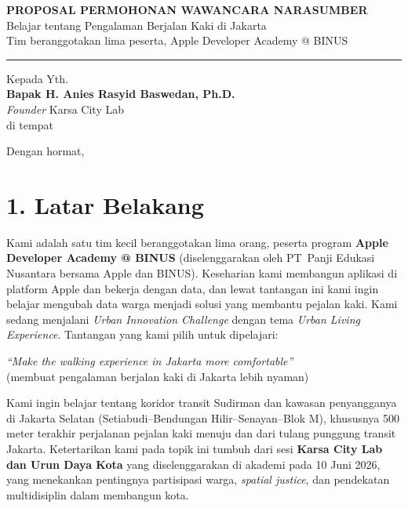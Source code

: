 \documentclass[11pt,a4paper]{article}
\begin{document}
\begin{center}
  {\Large\bfseries PROPOSAL PERMOHONAN WAWANCARA NARASUMBER}\\[4pt]
  {\normalsize Belajar tentang Pengalaman Berjalan Kaki di Jakarta}\\[2pt]
  {\small Tim beranggotakan lima peserta, Apple Developer Academy @ BINUS}
\end{center}

\vspace{4pt}
\hrule
\vspace{14pt}

\noindent
Kepada Yth.\\
\textbf{Bapak H. Anies Rasyid Baswedan, Ph.D.}\\
\textit{Founder} Karsa City Lab\\
di tempat

\vspace{10pt}
Dengan hormat,

\section*{1. Latar Belakang}

Kami adalah satu tim kecil beranggotakan lima orang, peserta program \textbf{Apple Developer Academy @ BINUS} (diselenggarakan oleh PT~Panji Edukasi Nusantara bersama Apple dan BINUS). Keseharian kami membangun aplikasi di platform Apple dan bekerja dengan data, dan lewat tantangan ini kami ingin belajar mengubah data warga menjadi solusi yang membantu pejalan kaki. Kami sedang menjalani \textit{Urban Innovation Challenge} dengan tema \textit{Urban Living Experience}. Tantangan yang kami pilih untuk dipelajari:

\begin{center}
  \textit{``Make the walking experience in Jakarta more comfortable''}\\
  (membuat pengalaman berjalan kaki di Jakarta lebih nyaman)
\end{center}

Kami ingin belajar tentang koridor transit Sudirman dan kawasan penyangganya di Jakarta Selatan (Setiabudi--Bendungan Hilir--Senayan--Blok M), khususnya 500 meter terakhir perjalanan pejalan kaki menuju dan dari tulang punggung transit Jakarta. Ketertarikan kami pada topik ini tumbuh dari sesi \textbf{Karsa City Lab dan Urun Daya Kota} yang diselenggarakan di akademi pada 10 Juni 2026, yang menekankan pentingnya partisipasi warga, \textit{spatial justice}, dan pendekatan multidisiplin dalam membangun kota.
\end{document}
